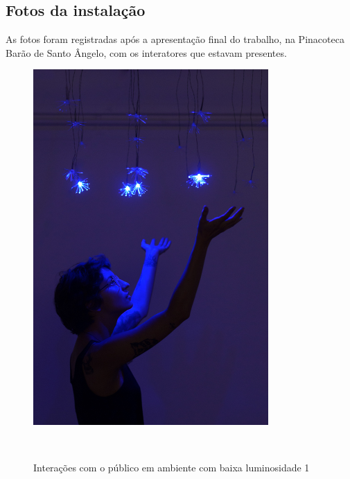 %
%

\begin{apendicesenv}

\chapter{Fotos da instalação}
\label{app:instalacao}

As fotos foram registradas após a apresentação final do trabalho, na Pinacoteca Barão de Santo Ângelo, com os interatores que estavam presentes.

\begin{figure}[H]
  \begin{center}
    \caption{Interações com o público em ambiente com baixa luminosidade 1}
    \vspace*{0,2cm}
    \includegraphics[width=0.8\textwidth]{./04-figuras/instalacao_1}
    \label{fig:instalacao_1}
  \end{center}
  \vspace*{-0,9cm}
  \\
\end{figure}


\end{apendicesenv}
